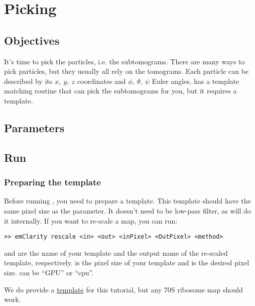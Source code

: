 \section{Picking} \label{sec:picking}

\subsection{Objectives}

It's time to pick the particles, i.e. the subtomograms. There are many ways to pick particles, but they usually all rely on the tomograms. Each particle can be described by its $x,\ y,\ z$ coordinates and $\phi,\ \theta,\ \psi$ Euler angles. {\emClarity} has a template matching routine that can pick the subtomograms for you, but it requires a template.

\subsection{Parameters}



\subsection{Run} \label{sec:picking:run}

\subsubsection{Preparing the template}
Before running , you need to prepare a template. This template should have the same pixel size as the  parameter. It doesn't need to be low-pass filter, as {\emClarity} will do it internally. If you want to re-scale a map, you can run:
\begin{lstlisting}
>> emClarity rescale <in> <out> <inPixel> <OutPixel> <method>
\end{lstlisting}
 and  are the name of your template and the output name of the re-scaled template, respectively.  is the pixel size of your template and  is the desired pixel size.  can be ``GPU'' or ``cpu''.


\begin{note}We do provide a \href{https://github.com/bHimes/emClarity}{template} for this tutorial, but any 70S ribosome map should work.
\end{note}

